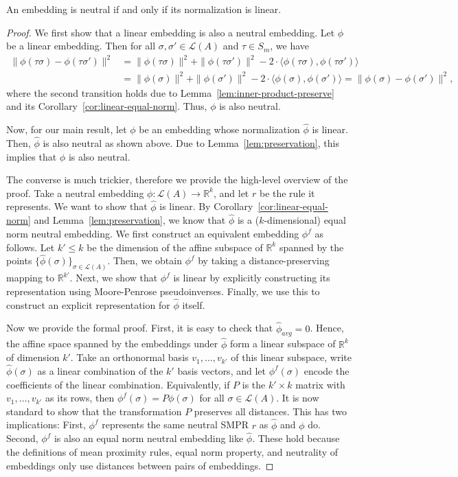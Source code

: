 \documentclass[prodmode,acmec]{ec-acmsmall}
\newcommand{\calL}{{\mathcal{L}}}
\newcommand{\rank}{{\calL(A)}}
\begin{document}
\begin{theorem}
An embedding is neutral if and only if its normalization is linear. 
\label{thm:neutral-linear}
\end{theorem}
\begin{proof}
We first show that a linear embedding is also a neutral embedding. Let $\phi$ be a linear embedding. Then for all $\sigma,\sigma' \in \rank$ and $\tau \in S_m$, we have
\begin{align*}
\|\phi(\tau \sigma)-\phi(\tau \sigma')\|^2 &= \|\phi(\tau \sigma)\|^2 + \|\phi(\tau \sigma')\|^2 - 2\cdot \langle \phi(\tau \sigma), \phi(\tau \sigma') \rangle \\
&= \|\phi(\sigma)\|^2 + \|\phi(\sigma')\|^2 - 2\cdot \langle \phi(\sigma), \phi(\sigma') \rangle = \|\phi(\sigma)-\phi(\sigma')\|^2,
\end{align*}
where the second transition holds due to Lemma~\ref{lem:inner-product-preserve} and its Corollary~\ref{cor:linear-equal-norm}. Thus, $\phi$ is also neutral. 

Now, for our main result, let $\phi$ be an embedding whose normalization $\hat{\phi}$ is linear. Then, $\hat{\phi}$ is also neutral as shown above. Due to Lemma~\ref{lem:preservation}, this implies that $\phi$ is also neutral.

The converse is much trickier, therefore we provide the high-level overview of the proof. Take a neutral embedding $\phi : \rank \rightarrow \mathbb{R}^k$, and let $r$ be the rule it represents. We want to show that $\hat{\phi}$ is linear. By Corollary~\ref{cor:linear-equal-norm} and Lemma~\ref{lem:preservation}, we know that $\hat{\phi}$ is a ($k$-dimensional) equal norm neutral embedding. We first construct an equivalent embedding $\phi^f$ as follows. Let $k' \le k$ be the dimension of the affine subspace of $\mathbb{R}^k$ spanned by the points $\{\hat{\phi}(\sigma)\}_{\sigma \in \rank}$. Then, we obtain $\phi^f$ by taking a distance-preserving mapping to $\mathbb{R}^{k'}$. Next, we show that $\phi^f$ is linear by explicitly constructing its representation using Moore-Penrose pseudoinverses. Finally, we use this to construct an explicit representation for $\hat{\phi}$ itself. 

Now we provide the formal proof. First, it is easy to check that $\hat{\phi}_{avg} = 0$. Hence, the affine space spanned by the embeddings under $\hat{\phi}$ form a linear subspace of $\mathbb{R}^k$ of dimension $k'$. Take an orthonormal basis $v_1,\ldots,v_{k'}$ of this linear subspace, write $\hat{\phi}(\sigma)$ as a linear combination of the $k'$ basis vectors, and let $\phi^f(\sigma)$ encode the coefficients of the linear combination. Equivalently, if $P$ is the $k' \times k$ matrix with $v_1,\ldots,v_{k'}$ as its rows, then $\phi^f(\sigma) = P \phi(\sigma)$ for all $\sigma \in \rank$. It is now standard to show that the transformation $P$ preserves all distances. This has two implications: First, $\phi^f$ represents the same neutral SMPR $r$ as $\hat{\phi}$ and $\phi$ do. Second, $\phi^f$ is also an equal norm neutral embedding like $\hat{\phi}$. These hold because the definitions of mean proximity rules, equal norm property, and neutrality of embeddings only use distances between pairs of embeddings. 


\end{proof}
\end{document}
